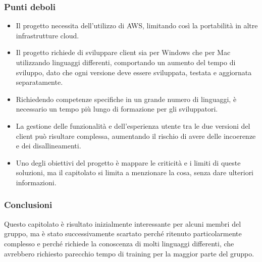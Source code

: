     \subsubsection{Punti deboli}
    \begin{itemize}
    \item Il progetto necessita dell’utilizzo di AWS, limitando così la portabilità in altre infrastrutture cloud.
    \item Il progetto richiede di sviluppare client sia per Windows che per Mac utilizzando linguaggi differenti, comportando un aumento del tempo di sviluppo, dato che ogni versione deve essere sviluppata, testata e aggiornata separatamente.
    \item Richiedendo competenze specifiche in un grande numero di linguaggi, è necessario un tempo più lungo di formazione per gli sviluppatori.
    \item La gestione delle funzionalità e dell’esperienza utente tra le due versioni del client può risultare complessa, aumentando il rischio di avere delle incoerenze e dei disallineamenti.
    \item Uno degli obiettivi del progetto è mappare le criticità e i limiti di queste soluzioni, ma il capitolato si limita a menzionare la cosa, senza dare ulteriori informazioni.
\end{itemize}
    \subsubsection{Conclusioni}
   Questo capitolato è risultato inizialmente interessante per alcuni membri del gruppo, ma è stato successivamente scartato perché ritenuto particolarmente complesso e perché richiede la conoscenza di molti linguaggi differenti, che avrebbero richiesto parecchio tempo di training per la maggior parte del gruppo.
